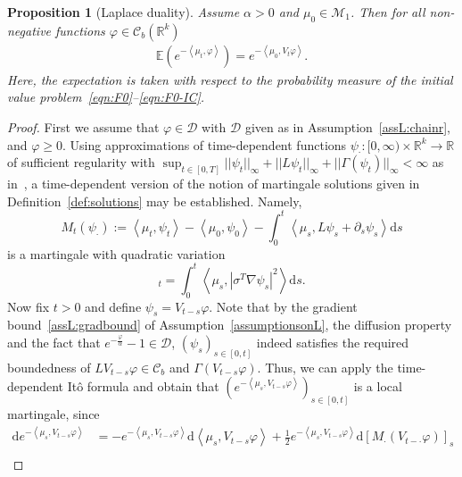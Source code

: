 \documentclass{article}
\newcommand{\dd}{\text{d}}
\newcommand{\av}[1]{\left<#1\right>}
\newtheorem{proposition}[theorem]{Proposition}
\newcommand{\R}{\mathbb{R}}
\newcommand{\E}{\mathbb{E}}
\newcommand{\C}{\mathcal C}
\begin{document}
\smallskip 


\begin{proposition}[Laplace duality]
  \label{prop:laplace}
  Assume $\alpha >0$ and $\mu_0 \in \mathcal M_1$. Then for all non-negative functions
  $\varphi \in \C_b(\R^k)$
  \begin{align}
    \E \left(e^{-\av{\mu_t,\varphi}}\right) = e^{-  \av{\mu_0, V_t \varphi}}.  
    \label{eqn:laplace}    
    \end{align}     
    Here, the expectation is taken with respect to the probability measure of the initial value
    problem~\eqref{eqn:F0}--\eqref{eqn:F0-IC}.
\end{proposition}


\begin{proof}
  First we assume that $\varphi \in \mathcal D$ with $\mathcal D$ given as in Assumption~\ref{assL:chainr},
  and $\varphi \geq 0$. Using approximations of time-dependent functions
  $\psi_\cdot\colon [0,\infty)\times \R^k \to \R$ of sufficient regularity with
  $\sup_{t \in [0,T]}||\psi_t||_\infty + ||L \psi_t||_\infty + ||\Gamma(\psi_t)||_\infty< \infty$ as
  in~\cite{Konarovskyi2024a}, a time-dependent version of the notion of martingale solutions given in
  Definition~\ref{def:solutions} may be established. Namely,
  \begin{equation*}
    M_t(\psi_\cdot):=  \av{\mu_t, \psi_t} - \av{\mu_0, \psi_0} - \int_0^t \av{\mu_s, L \psi_s + \partial_s \psi_s} \dd s
  \end{equation*}
  is a martingale with quadratic variation
  \begin{equation*}
    [M_\cdot]_t =  \int_0^t \av{\mu_s, |\sigma^T \nabla \psi_s|^2} \dd s.
  \end{equation*}
  Now fix $t > 0$ and define $\psi_s = V_{t-s} \varphi$.  Note that by the gradient bound~\ref{assL:gradbound}
  of Assumption~\ref{assumptionsonL}, the diffusion property and the fact that
  $e^{-\frac{\varphi}{\alpha}}-1 \in \mathcal{D}$, $(\psi_s)_{s \in [0,t]}$ indeed satisfies the required
  boundedness of $L V_{t-s} \varphi \in \C_b$ and $\Gamma(V_{t-s} \varphi)$.  Thus, we can apply the
  time-dependent It\^o formula and obtain that $\left(e^{-\av{\mu_s, V_{t-s}\varphi}}\right)_{s \in [0,t]}$ is
  a local martingale, since
  \begin{align*}
    \dd e^{-\av{\mu_s, V_{t-s}\varphi}} &=  -e^{-\av{\mu_s, V_{t-s}\varphi}} \dd \av{\mu_s, V_{t-s}\varphi}
                                          + \frac{1}{2} e^{-\av{\mu_s, V_{t-s}\varphi}} \dd [M_\cdot(V_{t-\cdot} \varphi)]_s\\

\end{align*}
\end{proof}
\end{document}
